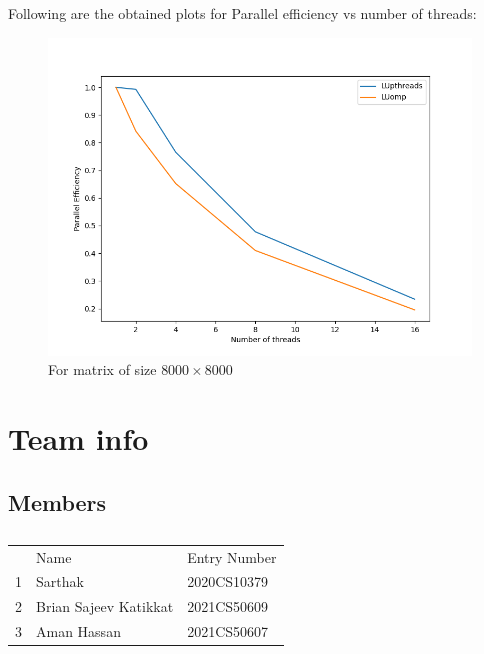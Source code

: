 \documentclass{article}
\begin{document}
Following are the obtained plots for Parallel efficiency vs number of threads:

%

\begin{figure}[!htb]
    \centering
    \includegraphics[width=15cm]{n8000/Both.png}
    \caption{For matrix of size $8000 \times 8000$ }
\end{figure}

\clearpage

\section{Team info}

\subsection{Members}

\begin{table}[!htb]
	\centering
	\begin{tabular}{lll}
		  & Name                  & Entry Number \\
		1 & Sarthak               & 2020CS10379  \\
		2 & Brian Sajeev Katikkat & 2021CS50609  \\
		3 & Aman Hassan           & 2021CS50607 
	\end{tabular}
	\caption{}
	\label{team_members}
\end{table}
\end{document}
